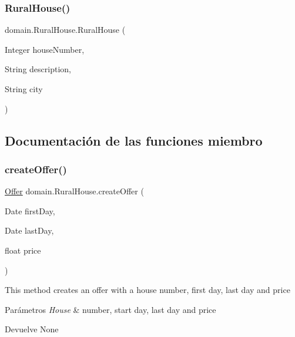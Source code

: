 \mbox{\label{classdomain_1_1_rural_house_aed816133d8047632fa70f3f83758274d}} 
\subsubsection{\texorpdfstring{RuralHouse()}{RuralHouse()}\hspace{0.1cm}{\footnotesize\ttfamily [2/2]}}
{\footnotesize\ttfamily domain.\+Rural\+House.\+Rural\+House (\begin{DoxyParamCaption}\item[{Integer}]{house\+Number,  }\item[{String}]{description,  }\item[{String}]{city }\end{DoxyParamCaption})}



\subsection{Documentación de las funciones miembro}
\mbox{\label{classdomain_1_1_rural_house_a58e17e08a7b28a75bc1b8e3d6ac01764}} 
\subsubsection{\texorpdfstring{createOffer()}{createOffer()}}
{\footnotesize\ttfamily \mbox{\hyperlink{classdomain_1_1_offer}{Offer}} domain.\+Rural\+House.\+create\+Offer (\begin{DoxyParamCaption}\item[{Date}]{first\+Day,  }\item[{Date}]{last\+Day,  }\item[{float}]{price }\end{DoxyParamCaption})}

This method creates an offer with a house number, first day, last day and price


\begin{DoxyParams}{Parámetros}
{\em House} & number, start day, last day and price \\
\hline
\end{DoxyParams}
\begin{DoxyReturn}{Devuelve}
None 
\end{DoxyReturn}
\mbox{\label{classdomain_1_1_rural_house_a92f3f1fa5d605f34e95f4e4175ef2629}} 
